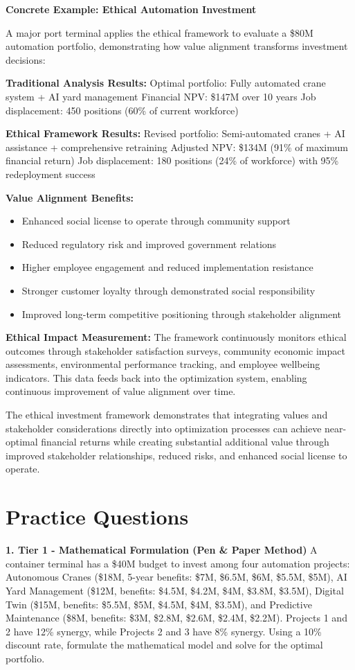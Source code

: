 \documentclass{article}
\begin{document}
\textbf{Concrete Example: Ethical Automation Investment}

A major port terminal applies the ethical framework to evaluate a \$80M automation portfolio, demonstrating how value alignment transforms investment decisions:

\textbf{Traditional Analysis Results:}
Optimal portfolio: Fully automated crane system + AI yard management
Financial NPV: \$147M over 10 years
Job displacement: 450 positions (60\% of current workforce)

\textbf{Ethical Framework Results:}
Revised portfolio: Semi-automated cranes + AI assistance + comprehensive retraining
Adjusted NPV: \$134M (91\% of maximum financial return)
Job displacement: 180 positions (24\% of workforce) with 95\% redeployment success

\textbf{Value Alignment Benefits:}
\begin{itemize}
\item Enhanced social license to operate through community support
\item Reduced regulatory risk and improved government relations
\item Higher employee engagement and reduced implementation resistance
\item Stronger customer loyalty through demonstrated social responsibility
\item Improved long-term competitive positioning through stakeholder alignment
\end{itemize}

\textbf{Ethical Impact Measurement:}
The framework continuously monitors ethical outcomes through stakeholder satisfaction surveys, community economic impact assessments, environmental performance tracking, and employee wellbeing indicators. This data feeds back into the optimization system, enabling continuous improvement of value alignment over time.

The ethical investment framework demonstrates that integrating values and stakeholder considerations directly into optimization processes can achieve near-optimal financial returns while creating substantial additional value through improved stakeholder relationships, reduced risks, and enhanced social license to operate.

\section{Practice Questions}

\textbf{1. Tier 1 - Mathematical Formulation (Pen \& Paper Method)}
A container terminal has a \$40M budget to invest among four automation projects: Autonomous Cranes (\$18M, 5-year benefits: \$7M, \$6.5M, \$6M, \$5.5M, \$5M), AI Yard Management (\$12M, benefits: \$4.5M, \$4.2M, \$4M, \$3.8M, \$3.5M), Digital Twin (\$15M, benefits: \$5.5M, \$5M, \$4.5M, \$4M, \$3.5M), and Predictive Maintenance (\$8M, benefits: \$3M, \$2.8M, \$2.6M, \$2.4M, \$2.2M). Projects 1 and 2 have 12\% synergy, while Projects 2 and 3 have 8\% synergy. Using a 10\% discount rate, formulate the mathematical model and solve for the optimal portfolio.
\end{document}
